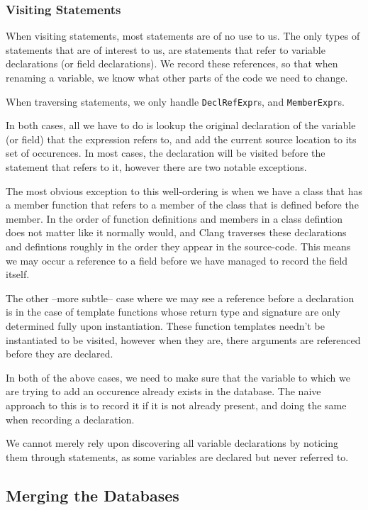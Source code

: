 \subsubsection{Visiting Statements}
\label{sec:visitstmt}
When visiting statements, most statements are of no use to us. The only types
of statements that are of interest to us, are statements that refer to variable
declarations (or field declarations). We record these references, so that when
renaming a variable, we know what other parts of the code we need to change.

When traversing statements, we only handle \lstinline|DeclRefExpr|s, and
\lstinline|MemberExpr|s.

In both cases, all we have to do is lookup the original declaration of the
variable (or field) that the expression refers to, and add the current source
location to its set of occurences. In most cases, the declaration will be
visited before the statement that refers to it, however there are two notable
exceptions.

The most obvious exception to this well-ordering is when we have a class that
has a member function that refers to a member of the class that is defined
before the member. In \CC{} the order of function definitions and members in a
class defintion does not matter like it normally would, and Clang traverses
these declarations and defintions roughly in the order they appear in the
source-code. This means we may occur a reference to a field before we have
managed to record the field itself.

The other --more subtle-- case where we may see a reference before a declaration
is in the case of template functions whose return type and signature are only
determined fully upon instantiation. These function templates needn't be
instantiated to be visited, however when they are, there arguments are
referenced before they are declared.

In both of the above cases, we need to make sure that the variable to which we
are trying to add an occurence already exists in the database. The naive
approach to this is to record it if it is not already present, and doing the
same when recording a declaration.

We cannot merely rely upon discovering all variable declarations by noticing
them through statements, as some variables are declared but never referred to.

\subsection{Merging the Databases}
\label{sec:dbmerge}

